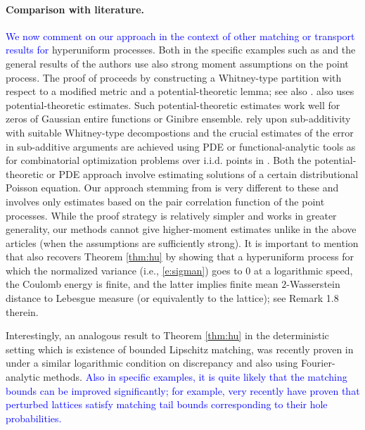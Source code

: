 \documentclass[12pt]{article}
\newcommand{\1}{\mathbf{1}}
\newcommand{\dy}[1]{\textcolor{blue}{#1}}
\newcommand{\dy}[1]{#1}%
\begin{document}
{{{\paragraph{{Comparison with literature.}}
\dy{We now comment on our approach in the context of other matching or transport results for} hyperuniform processes. Both in the specific examples such as \cite{sodin2006random,jalowy2021wasserstein,prod2021contributions}  and the general results of \cite{butez2024} the authors use also strong moment assumptions on the point process. The proof of \cite{sodin2006random} proceeds by constructing a Whitney-type partition with respect to a modified metric and a potential-theoretic lemma; see also \cite{sodin2010uniformly}. \cite{jalowy2021wasserstein} also uses potential-theoretic estimates. Such potential-theoretic estimates work well for zeros of Gaussian entire  functions or Ginibre ensemble. \cite{prod2021contributions,butez2024} rely upon sub-additivity with suitable Whitney-type decompostions and the crucial estimates of the error in sub-additive arguments are achieved using PDE or functional-analytic tools as for combinatorial optimization problems over i.i.d. points in  \cite{ambrosio2022quadratic,goldman2021convergence,goldman2023optimal}. Both the potential-theoretic or PDE approach involve estimating solutions of a certain distributional Poisson equation. Our approach stemming from \cite{bobkov2020transport} is very different to these and involves only estimates based on the pair correlation function of the point processes. While the proof strategy is relatively simpler and works in greater generality, our methods cannot give higher-moment estimates unlike in the above articles (when the assumptions are sufficiently strong). It is important to mention that \cite{huesmann2024link} also recovers Theorem \ref{thm:hu} by showing that a hyperuniform process for which the normalized variance (i.e., \eqref{e:sigman}) goes to $0$ at a logarithmic speed, the Coulomb energy is finite, and the latter implies finite mean $2$-Wasserstein distance to Lebesgue measure (or equivalently to the lattice); see Remark 1.8 therein.


 Interestingly, an analogous result to Theorem \ref{thm:hu} in the deterministic setting which is existence of bounded Lipschitz matching, was recently proven in \cite{koivusalo2024sharp} under a similar logarithmic condition on discrepancy and also using Fourier-analytic methods. \dy{Also in specific examples, it is quite likely that the matching bounds can be improved significantly; for example, very recently \cite{elboim2025optimal} have proven that perturbed lattices satisfy matching tail bounds corresponding to their hole probabilities.}

}}}
\end{document}
